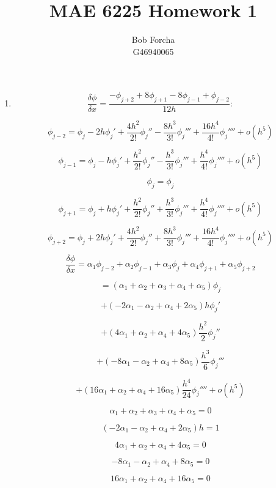 \documentclass[12pt,a4paper]{report}
\author{Bob Forcha\\G46940065}
\title{MAE 6225 Homework 1}
\begin{document}
\begin{titlepage}
\maketitle
\end{titlepage}
\begin{enumerate}
\item $$\frac{\delta\phi}{\delta x} = \frac{-\phi_{j+2} + 8\phi_{j+1} - 8\phi_{j-1} + \phi_{j-2}}{12h}:$$

$$\phi_{j-2} = \phi_j - 2h{\phi_j}' + \frac{4h^2}{2!}{\phi_j}'' - \frac{8h^3}{3!}{\phi_j}''' + \frac{16h^4}{4!}{\phi_j}'''' + o\left(h^5\right)$$

$$\phi_{j-1} = \phi_j - h{\phi_j}' + \frac{h^2}{2!}{\phi_j}'' - \frac{h^3}{3!}{\phi_j}''' + \frac{h^4}{4!}{\phi_j}'''' + o\left(h^5\right)$$

$$\phi_j = \phi_j$$

$$\phi_{j+1} = \phi_j + h{\phi_j}' + \frac{h^2}{2!}{\phi_j}'' + \frac{h^3}{3!}{\phi_j}''' + \frac{h^4}{4!}{\phi_j}''''+ o\left(h^5\right)$$

$$\phi_{j+2} = \phi_j + 2h{\phi_j}' + \frac{4h^2}{2!}{\phi_j}'' + \frac{8h^3}{3!}{\phi_j}''' + \frac{16h^4}{4!}{\phi_j}'''' + o\left(h^5\right)$$

$$\frac{\delta\phi}{\delta x} = \alpha_1\phi_{j-2} + \alpha_2\phi_{j-1} + \alpha_3\phi_{j} + \alpha_4\phi_{j+1} + \alpha_5\phi_{j+2}$$

$$= \left(\alpha_1 + \alpha_2 + \alpha_3 + \alpha_4 + \alpha_5\right)\phi_j$$

$$+ \left(-2\alpha_1 - \alpha_2 + \alpha_4 + 2\alpha_5\right)h{\phi_j}'$$

$$+ \left(4\alpha_1 + \alpha_2 + \alpha_4 + 4\alpha_5\right)\frac{h^2}{2}{\phi_j}''$$

$$+ \left(-8\alpha_1 - \alpha_2 + \alpha_4 + 8\alpha_5\right)\frac{h^3}{6}{\phi_j}'''$$

$$+ \left(16\alpha_1 + \alpha_2 + \alpha_4 + 16\alpha_5\right)\frac{h^4}{24}{\phi_j}'''' + o\left(h^5\right)$$

\pagebreak

$$\alpha_1 + \alpha_2 + \alpha_3 + \alpha_4 + \alpha_5 = 0$$

$$\left(-2\alpha_1 - \alpha_2 + \alpha_4 + 2\alpha_5\right)h = 1$$

$$4\alpha_1 + \alpha_2 + \alpha_4 + 4\alpha_5 = 0$$

$$-8\alpha_1 - \alpha_2 + \alpha_4 + 8\alpha_5 = 0$$

$$16\alpha_1 + \alpha_2 + \alpha_4 + 16\alpha_5 = 0$$


\end{enumerate}
\end{document}
